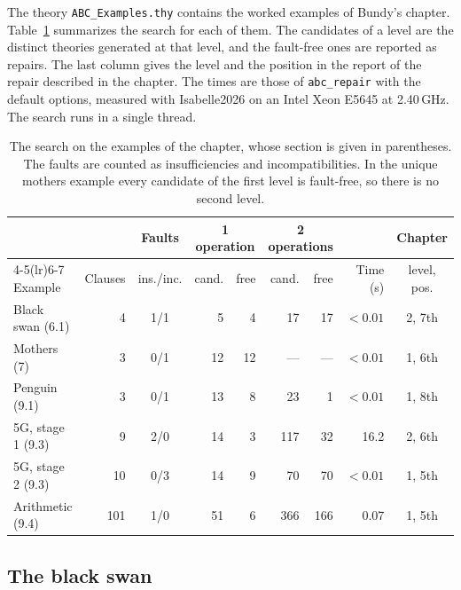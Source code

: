 \documentclass[preprint,12pt]{elsarticle}
\newcommand{\isa}[1]{\texttt{#1}}
\begin{document}
The theory \isa{ABC\_Examples.thy} contains the worked examples of Bundy's
chapter. Table~\ref{tab:examples} summarizes the search for each of them.
The candidates of a level are the distinct theories generated at that
level, and the fault-free ones are reported as repairs. The last column
gives the level and the position in the report of the repair described in
the chapter. The times are those of \isa{abc\_repair} with the default
options, measured with Isabelle2026 on an Intel Xeon E5645 at 2.40\,GHz.
The search runs in a single thread.

\begin{table}[t]
\centering
\footnotesize
\setlength{\tabcolsep}{4pt}
\begin{tabular}{@{}l r c r r r r r c@{}}
\toprule
& & Faults & \multicolumn{2}{c}{1 operation} & \multicolumn{2}{c}{2 operations}
  & & Chapter \\
\cmidrule(lr){4-5}\cmidrule(lr){6-7}
Example & Clauses & ins./inc. & cand. & free & cand. & free & Time (s)
  & level, pos. \\
\midrule
Black swan (6.1)  &   4 & 1/1 &  5 &  4 &  17 &  17 & $<0.01$ & 2, 7th \\
Mothers (7)       &   3 & 0/1 & 12 & 12 & --- & --- & $<0.01$ & 1, 6th \\
Penguin (9.1)     &   3 & 0/1 & 13 &  8 &  23 &   1 & $<0.01$ & 1, 8th \\
5G, stage 1 (9.3) &   9 & 2/0 & 14 &  3 & 117 &  32 & 16.2    & 2, 6th \\
5G, stage 2 (9.3) &  10 & 0/3 & 14 &  9 &  70 &  70 & $<0.01$ & 1, 5th \\
Arithmetic (9.4)  & 101 & 1/0 & 51 &  6 & 366 & 166 & 0.07    & 1, 5th \\
\bottomrule
\end{tabular}
\caption{The search on the examples of the chapter, whose section is given
in parentheses. The faults are counted as insufficiencies and
incompatibilities. In the unique mothers example every candidate of the first
level is fault-free, so there is no second level.}
\label{tab:examples}
\end{table}

\subsection{The black swan}
\end{document}
